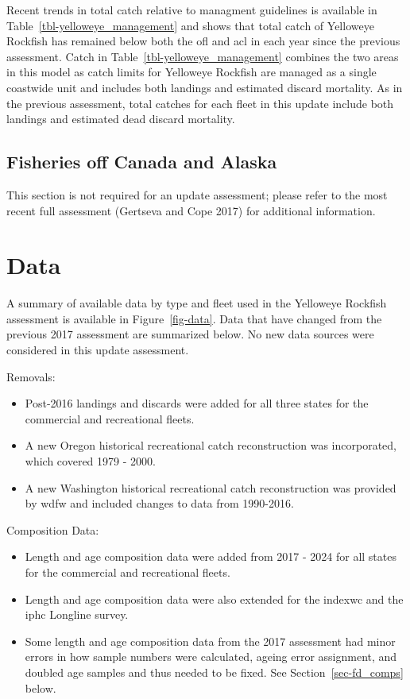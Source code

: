 \documentclass[
]{scrartcl}
\providecommand{\tightlist}{%
  \setlength{\itemsep}{0pt}\setlength{\parskip}{0pt}}\usepackage{longtable,booktabs,array}
\begin{document}
Recent trends in total catch relative to managment guidelines is
available in Table~\ref{tbl-yelloweye_management} and shows that total
catch of Yelloweye Rockfish has remained below both the \gls{ofl} and
\gls{acl} in each year since the previous assessment. Catch in
Table~\ref{tbl-yelloweye_management} combines the two areas in this
model as catch limits for Yelloweye Rockfish are managed as a single
coastwide unit and includes both landings and estimated discard
mortality. As in the previous assessment, total catches for each fleet
in this update include both landings and estimated dead discard
mortality.

\subsection{Fisheries off Canada and
Alaska}\label{fisheries-off-canada-and-alaska}

This section is not required for an update assessment; please refer to
the most recent full assessment (Gertseva and Cope 2017) for additional
information.

\newpage{}

\section{Data}\label{sec-data}

A summary of available data by type and fleet used in the Yelloweye
Rockfish assessment is available in Figure~\ref{fig-data}. Data that
have changed from the previous 2017 assessment are summarized below. No
new data sources were considered in this update assessment.

Removals:

\begin{itemize}
\tightlist
\item
  Post-2016 landings and discards were added for all three states for
  the commercial and recreational fleets.
\item
  A new Oregon historical recreational catch reconstruction was
  incorporated, which covered 1979 - 2000.
\item
  A new Washington historical recreational catch reconstruction was
  provided by \gls{wdfw} and included changes to data from 1990-2016.
\end{itemize}

Composition Data:

\begin{itemize}
\tightlist
\item
  Length and age composition data were added from 2017 - 2024 for all
  states for the commercial and recreational fleets.
\item
  Length and age composition data were also extended for the
  \gls{indexwc} and the \gls{iphc} Longline survey.
\item
  Some length and age composition data from the 2017 assessment had
  minor errors in how sample numbers were calculated, ageing error
  assignment, and doubled age samples and thus needed to be fixed. See
  Section~\ref{sec-fd_comps} below.
\end{itemize}
\end{document}
